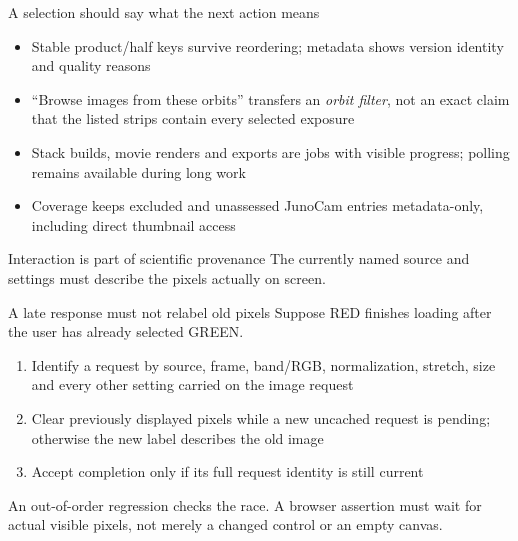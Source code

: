 \documentclass[aspectratio=169,11pt]{beamer}
\newcommand{\currevsec}{}
\newcommand{\revsec}[1]{\gdef\currevsec{#1}}
\begin{document}
\begin{frame}{A selection should say what the next action means}
  \revsec{4.16}
\begin{itemize}
    \item Stable product/half keys survive reordering; metadata shows version identity and quality reasons
    \item ``Browse images from these orbits'' transfers an \emph{orbit filter}, not an exact claim that the listed strips contain every selected exposure
    \item Stack builds, movie renders and exports are jobs with visible progress; polling remains available during long work
    \item Coverage keeps excluded and unassessed JunoCam entries metadata-only, including direct thumbnail access
  \end{itemize}
  \begin{block}{Interaction is part of scientific provenance}
    The currently named source and settings must describe the pixels actually on screen.
  \end{block}
\end{frame}

\begin{frame}{A late response must not relabel old pixels}
  \revsec{4.16}
Suppose RED finishes loading after the user has already selected GREEN.
  \vspace{0.3cm}
  \begin{enumerate}
    \item Identify a request by source, frame, band/RGB, normalization, stretch, size and every other setting carried on the image request
    \item Clear previously displayed pixels while a new uncached request is pending; otherwise the new label describes the old image
    \item Accept completion only if its full request identity is still current
  \end{enumerate}
  \vspace{0.2cm}
  An out-of-order regression checks the race. A browser assertion must wait for actual visible pixels, not merely a changed control or an empty canvas.
\end{frame}
\end{document}
